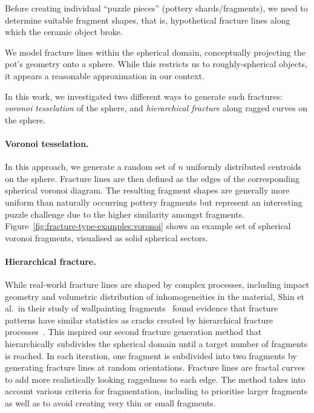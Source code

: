 \documentclass[acmlarge,screen,dvipsnames]{acmart}
\begin{document}
Before creating individual ``puzzle pieces'' (pottery
shards/fragments), we need to determine suitable fragment shapes, that
is, hypothetical fracture lines along which the ceramic object broke.

We model fracture lines within the spherical domain, conceptually
projecting the pot's geometry onto a sphere. While this restricts us
to roughly-spherical objects, it appears a reasonable approximation in
our context.

In this work, we investigated two different ways to generate such
fractures: \emph{voronoi tesselation} of the sphere, and
\emph{hierarchical fracture} along ragged curves on the sphere.

\paragraph{Voronoi tesselation.}
%
In this approach, we generate a random set of $n$ uniformly
distributed centroids on the sphere. Fracture lines are then defined
as the edges of the corresponding spherical voronoi diagram.
%
The resulting fragment shapes are generally more uniform than
naturally occurring pottery fragments but represent an interesting
puzzle challenge due to the higher similarity amongst fragments.
%
Figure~\ref{fig:fracture-type-examples:voronoi} shows an example set
of spherical voronoi fragments, visualised as solid spherical sectors.

\paragraph{Hierarchical fracture.}
%
While real-world fracture lines are shaped by complex processes,
including impact geometry and volumetric distribution of
inhomogeneities in the material, Shin et al.\ in their study of
wallpainting fragments~\cite{Shin:2012:ASF:2362402.2362404} found
evidence that fracture patterns have similar statistics as cracks
created by hierarchical fracture
processes~\cite{Bohn:2005:Four}.
%
This inspired our second fracture generation method that
hierarchically subdivides the spherical domain until a target number
of fragments is reached. In each iteration, one fragment is subdivided into 
two fragments by generating fracture lines at random orientations. 
Fracture lines are fractal curves to add more realistically looking raggedness 
to each edge. The method takes into account various criteria for fragmentation, including to prioritise larger fragments as well as to avoid creating very thin 
or small fragments. 
\end{document}
